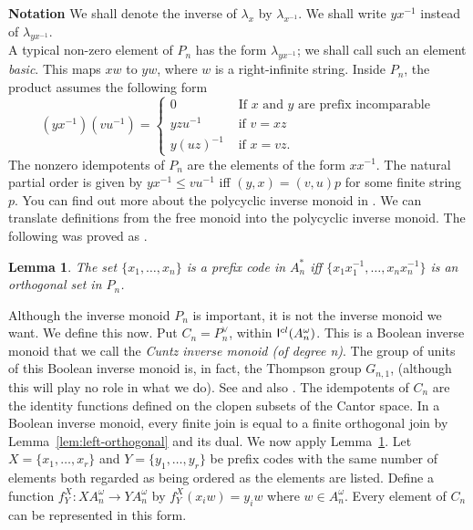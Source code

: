 \documentclass[a4paper]{amsart}
\newtheorem{lemma}[theorem]{Lemma}
\begin{document}
\noindent
{\bf Notation} We shall denote the inverse of $\lambda_{x}$ by $\lambda_{x^{-1}}$.
We shall write $yx^{-1}$ instead of $\lambda_{yx^{-1}}$. \\

A typical non-zero element of $P_{n}$ has the form  $\lambda_{yx^{-1}}$; we shall call such an element {\em basic}. 
This maps $xw$ to $yw$, where $w$ is a right-infinite string.
Inside $P_{n}$,
the product assumes the following form
$$
(yx^{-1})(vu^{-1}) = \begin{cases}
0 & \text { If } x \text{ and } y \text{ are prefix incomparable}\\
yzu^{-1} &  \text{ if } v = xz\\
y(uz)^{-1} & \text{ if } x = vz.
\end{cases}
$$The nonzero idempotents of $P_{n}$ are the elements of the form $xx^{-1}$.
The natural partial order is given by $yx^{-1} \leq vu^{-1}$ iff
$(y,x) = (v,u)p$ for some finite string $p$.
You can find out more about the polycyclic inverse monoid in \cite{Lawson1998}.
We can translate definitions from the free monoid into the polycyclic inverse monoid. The following was proved as \cite[Corollary 3.4]{Lawson2007a}.

\begin{lemma}\label{lem:pmr} The set $\{x_{1}, \ldots, x_{n}\}$ is a prefix code in $A_{n}^{\ast}$
iff $\{x_{1}x_{1}^{-1}, \ldots, x_{n}x_{n}^{-1} \}$ is an orthogonal set in $P_{n}$.
\end{lemma}

Although the inverse monoid $P_{n}$ is important, it is not the inverse monoid we want.
We define this now.
Put $C_{n} = P_{n}^{\vee}$, within $\mathsf{I}^{\tiny cl}(A_{n}^{\omega})$.
This is a Boolean inverse monoid that we call the {\em Cuntz inverse monoid (of degree n)}.
The group of units of this Boolean inverse monoid is, in fact, the Thompson group $G_{n,1}$,
(although this will play no role in what we do).
See \cite{Lawson2007b} and also \cite{LS1}. 
The idempotents of $C_{n}$ are the identity functions defined on the clopen subsets of the Cantor space.
In a Boolean inverse monoid, every finite join is equal to a finite orthogonal join
by Lemma~\ref{lem:left-orthogonal} and its dual.
We now apply Lemma~\ref{lem:pmr}.
Let $X = \{x_{1}, \ldots, x_{r}\}$ and $Y = \{y_{1}, \ldots, y_{r}\}$
be prefix codes with the same number of elements both regarded as being ordered
as the elements are listed.
Define a function $f^{X}_{Y} \colon XA_{n}^{\omega} \rightarrow YA_{n}^{\omega}$
by $f^{X}_{Y}(x_{i}w) = y_{i}w$ where $w \in A_{n}^{\omega}$.
Every element of $C_{n}$ can be represented in this form.
\end{document}
